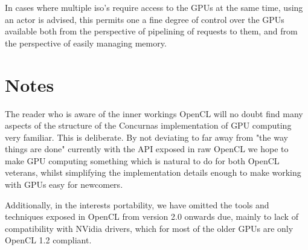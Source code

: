 \documentclass[conc-doc]{subfiles}
\begin{document}
In cases where multiple iso's require access to the GPUs at the same time, using an actor is advised, this permits one a fine degree of control over the GPUs available both from the perspective of pipelining of requests to them, and from the perspective of easily managing memory.

\section{Notes}
The reader who is aware of the inner workings OpenCL will no doubt find many aspects of the structure of the Concurnas implementation of GPU computing very familiar. This is deliberate. By not deviating to far away from "the way things are done" currently with the API exposed in raw OpenCL we hope to make GPU computing something which is natural to do for both OpenCL veterans, whilst simplifying the implementation details enough to make working with GPUs easy for newcomers.

Additionally, in the interests portability, we have omitted the tools and techniques exposed in OpenCL from version 2.0 onwards due, mainly to lack of compatibility with NVidia drivers, which for most of the older GPUs are only OpenCL 1.2 compliant.
\end{document}
